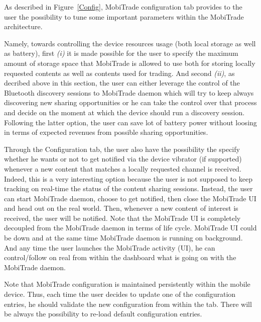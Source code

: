 As described in Figure~\ref{Config}, MobiTrade configuration tab provides to the user the possibility to tune some important parameters within the MobiTrade architecture. 

Namely, towards controlling the device resources usage (both local storage as well as battery), first  \emph{(i)} it is made possible for the user to specify the maximum amount of storage space that MobiTrade is allowed to use both for storing locally requested contents as well as contents used for trading. And second \emph{(ii)}, as decribed above in this section, the user can either leverage the control of the Bluetooth discovery sessions to MobiTrade daemon which will try to keep always discovering new sharing opportunities or he can take the control over that process and decide on the moment at which the device should run a discovery session. Following the latter option, the user can save lot of battery power without loosing in terms of expected revenues from possible sharing opportunities.

Through the Configuration tab, the user also have the possibility the specify whether he wants or not to get notified via the device vibrator (if supported) whenever a new content that matches a locally requested channel is received. Indeed, this is a very interesting option because the user is not supposed to keep tracking on real-time the status of the content sharing sessions. Instead, the user can start MobiTrade daemon, choose to get notified, then close the MobiTrade UI and head out on the real world. Then, whenever a new content of interest is received, the user will be notified. Note that the MobiTrade UI is completely decoupled from the MobiTrade daemon in terms of life cycle. MobiTrade UI could be down and at the same time MobiTrade daemon is running on background. And any time the user launches the MobiTrade activity (UI), he can control/follow on real from within the dashboard what is going on with the MobiTrade daemon.

Note that MobiTrade configuration is maintained persistently within the mobile device. Thus, each time the user decides to update one of the configuration entries, he should validate the new configuration from within the tab. There will be always the possibility to re-load default configuration entries.



